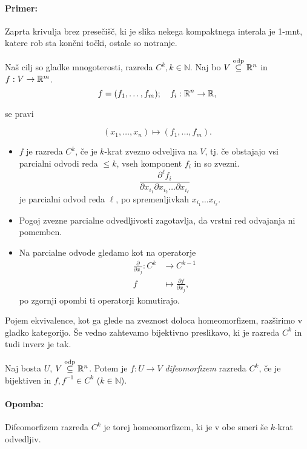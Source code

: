 \paragraph{Primer:}
Zaprta krivulja brez prese\v ci\v s\v c, ki je slika nekega kompaktnega interala je 1-mnt, katere rob sta kon\v cni to\v cki, ostale so
notranje.

Na\v s cilj so gladke mnogoterosti, razreda $C^k, k \in \mathbb{N}$. Naj bo $V \stackrel{\text{odp}}{\subseteq} \mathbb{R}^n$ in $f : V \to \mathbb{R}^m$.
\[
	f = (f_1, \ldots, f_m); \quad f_i : \mathbb{R}^n \to \mathbb{R},
\]
\begin{center}
se pravi
\end{center}
\[
	(x_1,\ldots,x_n) \mapsto (f_1, \ldots, f_m).
\]
\begin{itemize}
	\item{$f$ je razreda $C^k$, \v ce je $k$-krat zvezno odveljiva na $V$, tj. \v ce obstajajo vsi parcialni odvodi reda $\leq k$, vseh
		komponent $f_i$ in so zvezni.
		\[
			\frac{\partial^\ell f_i}{\partial x_{i_1}\partial x_{i_2} \ldots \partial x_{i_\ell}}
		\]
		je parcialni odvod reda $\ell$, po spremenljivkah $x_{i_1} \ldots x_{i_\ell}$.}
	\item{Pogoj zvezne parcialne odvedljivosti zagotavlja, da vrstni red odvajanja ni pomemben.}
	\item{Na parcialne odvode gledamo kot na operatorje
		\begin{align*}
			\frac{\partial}{\partial x_j} : C^k &\to C^{k-1} \\
			f &\mapsto \frac{\partial f}{\partial x_j},
		\end{align*}
		po zgornji opombi ti operatorji komutirajo.}
\end{itemize}

Pojem ekvivalence, kot ga glede na zveznost dolo\@ ca homeomorfizem, raz\v sirimo v gladko kategorijo. \v Se vedno zahtevamo bijektivno preslikavo,
ki je razreda $C^k$ in tudi inverz je tak.

\begin{defin}
	Naj bosta $U$, $V \stackrel{\text{odp}}{\subseteq} \mathbb{R}^n$. Potem je $f : U \to V$ \emph{difeomorfizem} razreda $C^k$, \v ce je bijektiven in $f, f^{-1} \in C^k$
	($k \in \mathbb{N}$).
\end{defin}

\paragraph{Opomba:} Difeomorfizem razreda $C^k$ je torej homeomorfizem, ki je v obe smeri \v se $k$-krat odvedljiv.\\[6pt]

